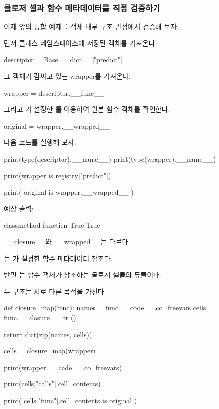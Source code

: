 \subsubsection{클로저 셀과 함수 메타데이터를 직접 검증하기}

이제 앞의 통합 예제를 객체 내부 구조 관점에서 검증해 보자.

먼저 클래스 네임스페이스에 저장된  객체를 가져온다.

\begin{dhkcode}
descriptor = Base.__dict__["predict"]
\end{dhkcode}

그 객체가 감싸고 있는 wrapper를 가져온다.

\begin{dhkcode}
wrapper = descriptor.__func__
\end{dhkcode}

그리고 가 설정한 를 이용하여 원본 함수 객체를 확인한다.

\begin{dhkcode}
original = wrapper.__wrapped__
\end{dhkcode}

다음 코드를 실행해 보자.

\begin{dhkcode}
print(type(descriptor).__name__)
print(type(wrapper).__name__)

print(wrapper is registry["predict"])

print(
    original is wrapper.__wrapped__
)
\end{dhkcode}

예상 출력:

\begin{dhkzsh}
classmethod
function
True
True
\end{dhkzsh}

\begin{dhknote}
\begin{dhksmry}[centered]
__closure__와 __wrapped__는 다르다
\end{dhksmry}
\end{dhknote}

는 가 설정한 함수 메타데이터 참조다.

반면 는 함수 객체가 참조하는 클로저 셀들의 튜플이다.

두 구조는 서로 다른 목적을 가진다.

\begin{dhkcode}
def closure_map(func):
    names = func.__code__.co_freevars
    cells = func.__closure__ or ()

    return dict(zip(names, cells))


cells = closure_map(wrapper)

print(wrapper.__code__.co_freevars)

print(cells["calls"].cell_contents)

print(
    cells["func"].cell_contents
    is original
)
\end{dhkcode}

